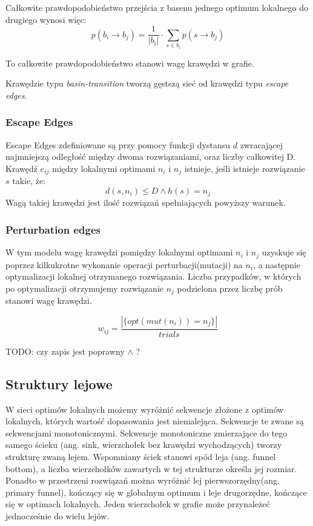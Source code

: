 Całkowite prawdopodobieństwo przejścia z basenu jednego optimum lokalnego do drugiego wynosi więc:
$$p(b_i \rightarrow b_j) = \frac{1}{|b_i|} \cdot \sum_{s\in{b_i}} p(s \rightarrow b_j)$$

To całkowite prawdopodobieństwo stanowi wagę krawędzi w grafie.

Krawędzie typu \textit{basin-transition} tworzą gęstszą sieć od krawędzi typu \textit{escape edges}.

\subsubsection*{Escape Edges}
Escape Edges zdefiniowane są przy pomocy funkcji dystansu $d$ zwracającej najmniejszą odległość między dwoma rozwiązaniami,
oraz liczby całkowitej D.
Krawędź $e_{ij}$ między lokalnymi optimami $n_i$ i $n_j$ istnieje, jeśli istnieje rozwiązanie $s$ takie, że:
\begin{equation}
      \label{eq:escape_edge_cond}
      d(s, n_i) \leq D \land h(s)=n_j
\end{equation}
Wagą takiej krawędzi jest ilość rozwiązań spełniających powyższy warunek.

\subsubsection{Perturbation edges}
W tym modelu wagę krawędzi pomiędzy lokalnymi optimami $n_i$ i $n_j$ uzyskuje się poprzez kilkukrotne wykonanie
operacji perturbacji(mutacji) na $n_i$, a następnie optymalizacji lokalnej otrzymanego rozwiązania.
Liczba przypadków, w których po optymalizacji otrzymujemy rozwiązanie $n_j$ podzielona przez liczbę prób stanowi wagę krawędzi.

$$
      w_{ij} = \frac{ |\{opt(mut(n_i)) = n_j\}| }{trials}
$$

TODO: czy zapis jest poprawny $\land$ ?

\subsection{Struktury lejowe}
W sieci optimów lokalnych możemy wyróżnić sekwencje złożone z optimów lokalnych, których wartość dopasowania jest niemalejąca.
Sekwencje te zwane są sekwencjami monotonicznymi\cite{DBLP:journals/heuristics/OchoaV18}.
Sekwencje monotoniczne zmierzające do tego samego ścieku (ang. sink, wierzchołek bez krawędzi wychodzących)
tworzy strukturę zwaną lejem. Wspomniany ściek stanowi spód leja (ang. funnel bottom), a liczba wierzchołków zawartych w tej strukturze określa jej rozmiar.
Ponadto w przestrzeni rozwiązań można wyróżnić lej pierwszorzędny(ang. primary funnel), kończący się w globalnym optimum i leje drugorzędne,
kończące się w optimach lokalnych. Jeden wierzchołek w grafie może przynależeć jednocześnie do wielu lejów.

